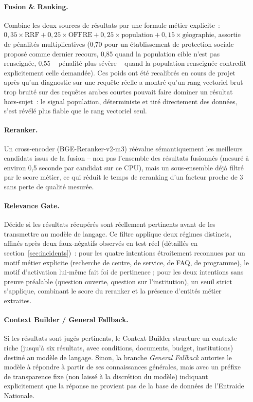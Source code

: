 \paragraph{Fusion \& Ranking.} Combine les deux sources de résultats par une formule métier explicite~: $0{,}35 \times \text{RRF} + 0{,}25 \times \text{OFFRE} + 0{,}25 \times \text{population} + 0{,}15 \times \text{géographie}$, assortie de pénalités multiplicatives (0,70 pour un établissement de protection sociale proposé comme dernier recours, 0,85 quand la population cible n'est pas renseignée, 0,55 -- pénalité plus sévère -- quand la population renseignée contredit explicitement celle demandée). Ces poids ont été recalibrés en cours de projet après qu'un diagnostic sur une requête réelle a montré qu'un rang vectoriel brut trop bruité sur des requêtes arabes courtes pouvait faire dominer un résultat hors-sujet~: le signal population, déterministe et tiré directement des données, s'est révélé plus fiable que le rang vectoriel seul.

\paragraph{Reranker.} Un cross-encoder (BGE-Reranker-v2-m3) réévalue sémantiquement les meilleurs candidats issus de la fusion -- non pas l'ensemble des résultats fusionnés (mesuré à environ 0,5 seconde par candidat sur ce CPU), mais un sous-ensemble déjà filtré par le score métier, ce qui réduit le temps de reranking d'un facteur proche de 3 sans perte de qualité mesurée.

\paragraph{Relevance Gate.} Décide si les résultats récupérés sont réellement pertinents avant de les transmettre au modèle de langage. Ce filtre applique deux régimes distincts, affinés après deux faux-négatifs observés en test réel (détaillés en section~\ref{sec:incidents})~: pour les quatre intentions étroitement reconnues par un motif métier explicite (recherche de centre, de service, de FAQ, de programme), le motif d'activation lui-même fait foi de pertinence ; pour les deux intentions sans preuve préalable (question ouverte, question sur l'institution), un seuil strict s'applique, combinant le score du reranker et la présence d'entités métier extraites.

\paragraph{Context Builder / General Fallback.} Si les résultats sont jugés pertinents, le Context Builder structure un contexte riche (jusqu'à six résultats, avec conditions, documents, budget, institutions) destiné au modèle de langage. Sinon, la branche \emph{General Fallback} autorise le modèle à répondre à partir de ses connaissances générales, mais avec un préfixe de transparence fixe (non laissé à la discrétion du modèle) indiquant explicitement que la réponse ne provient pas de la base de données de l'Entraide Nationale.

